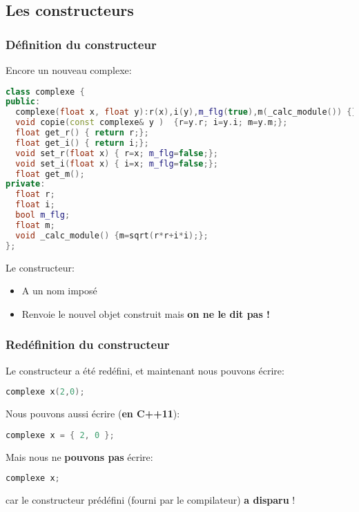 \documentclass{beamer}
\begin{document}
\subsection{Les constructeurs}
\begin{frame}[fragile=singleslide,shrink=20]
\frametitle {Définition du constructeur}
Encore un nouveau complexe:
\begin{lstlisting}[language=c++]
class complexe {
public:
  complexe(float x, float y):r(x),i(y),m_flg(true),m(_calc_module()) {}; 
  void copie(const complexe& y )  {r=y.r; i=y.i; m=y.m;};
  float get_r() { return r;};
  float get_i() { return i;};
  void set_r(float x) { r=x; m_flg=false;};
  void set_i(float x) { i=x; m_flg=false;};
  float get_m();
private:
  float r;
  float i;
  bool m_flg;
  float m;
  void _calc_module() {m=sqrt(r*r+i*i);};
};
\end{lstlisting}

Le constructeur:
\begin{itemize}
\item{A un nom imposé}
\item{Renvoie le nouvel objet construit mais \textbf{on ne le dit pas !}}
\end{itemize}
\end{frame}

\begin{frame}[fragile=singleslide,shrink=20]
\frametitle {Redéfinition du constructeur}
Le constructeur a été redéfini, et maintenant nous pouvons écrire:

\begin{lstlisting}[language=c++]
complexe x(2,0);
\end{lstlisting}

Nous pouvons aussi écrire (\textbf{en C++11}):

\begin{lstlisting}[language=c++]
complexe x = { 2, 0 };
\end{lstlisting}

Mais nous ne \textbf{pouvons pas} écrire:
\begin{lstlisting}[language=c++]
complexe x;
\end{lstlisting}
car le constructeur prédéfini (fourni par le compilateur) \textbf{a disparu} !
\end{frame}
\end{document}

